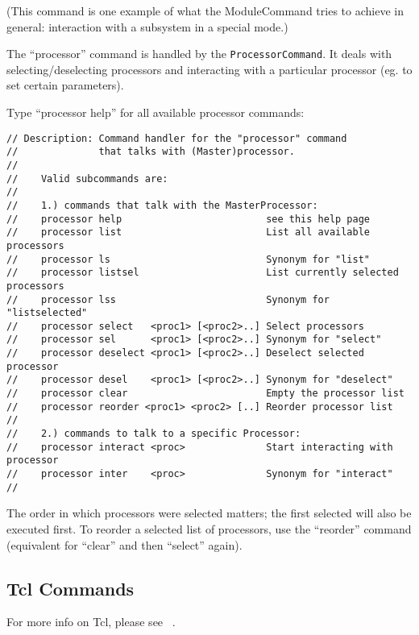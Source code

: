 \documentclass[12pt]{article}
\begin{document}
(This command is one example of what the ModuleCommand tries to achieve
in general: interaction with a subsystem in a special mode.)

The ``processor'' command is handled by the \texttt{ProcessorCommand}.
It deals with selecting/deselecting processors and interacting with a
particular processor (eg. to set certain parameters).

Type ``processor help'' for all available processor commands:
%
\begin{verbatim}
// Description: Command handler for the "processor" command
//              that talks with (Master)processor.
//
//    Valid subcommands are:
//
//    1.) commands that talk with the MasterProcessor:
//    processor help                         see this help page
//    processor list                         List all available processors
//    processor ls                           Synonym for "list"
//    processor listsel                      List currently selected processors
//    processor lss                          Synonym for "listselected"
//    processor select   <proc1> [<proc2>..] Select processors
//    processor sel      <proc1> [<proc2>..] Synonym for "select"
//    processor deselect <proc1> [<proc2>..] Deselect selected processor
//    processor desel    <proc1> [<proc2>..] Synonym for "deselect"
//    processor clear                        Empty the processor list
//    processor reorder <proc1> <proc2> [..] Reorder processor list
//
//    2.) commands to talk to a specific Processor:
//    processor interact <proc>              Start interacting with processor
//    processor inter    <proc>              Synonym for "interact"
//
\end{verbatim}

The order in which processors were selected matters; the first selected
will also be executed first. To reorder a selected list of processors,
use the ``reorder'' command (equivalent for ``clear'' and then
``select'' again).



\subsection{Tcl Commands }
\label{sec:TclCommands}

For more info on Tcl, please see ~\cite{TclInfo}.
\end{document}
